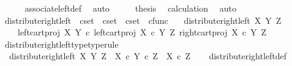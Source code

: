 \begin{isabellebody}
\ \ \ \ \isamarkupfalse%
\ associate{\isacharunderscore}{\kern0pt}left{\isacharunderscore}{\kern0pt}def\ \isamarkupfalse%
\ auto\isanewline
\ \ \isamarkupfalse%
\ \isamarkupfalse%
\ {\isacharquery}{\kern0pt}thesis\ \isamarkupfalse%
\ calculation\ \isamarkupfalse%
\ auto\isanewline
{}\isamarkupfalse%
%
\endisatagproof
{\isafoldproof}%
%
\isadelimproof
%
\endisadelimproof
%
\isadelimdocument
%
\endisadelimdocument
%
\isatagdocument
%
\isamarkuptrue%
%
\endisatagdocument
{\isafolddocument}%
%
\isadelimdocument
%
\endisadelimdocument
{}\isamarkupfalse%
\ distribute{\isacharunderscore}{\kern0pt}right{\isacharunderscore}{\kern0pt}left\ {\isacharcolon}{\kern0pt}{\isacharcolon}{\kern0pt}\ {\isachardoublequoteopen}cset\ {\isasymRightarrow}\ cset\ {\isasymRightarrow}\ cset\ {\isasymRightarrow}\ cfunc{\isachardoublequoteclose}\ \isanewline
\ \ {\isachardoublequoteopen}distribute{\isacharunderscore}{\kern0pt}right{\isacharunderscore}{\kern0pt}left\ X\ Y\ Z\ {\isacharequal}{\kern0pt}\ \isanewline
\ \ \ \ {\isasymlangle}left{\isacharunderscore}{\kern0pt}cart{\isacharunderscore}{\kern0pt}proj\ X\ Y\ {\isasymcirc}\isactrlsub c\ left{\isacharunderscore}{\kern0pt}cart{\isacharunderscore}{\kern0pt}proj\ {\isacharparenleft}{\kern0pt}X\ {\isasymtimes}\isactrlsub c\ Y{\isacharparenright}{\kern0pt}\ Z{\isacharcomma}{\kern0pt}\ right{\isacharunderscore}{\kern0pt}cart{\isacharunderscore}{\kern0pt}proj\ {\isacharparenleft}{\kern0pt}X\ {\isasymtimes}\isactrlsub c\ Y{\isacharparenright}{\kern0pt}\ Z{\isasymrangle}{\isachardoublequoteclose}\isanewline
\isanewline
{}\isamarkupfalse%
\ distribute{\isacharunderscore}{\kern0pt}right{\isacharunderscore}{\kern0pt}left{\isacharunderscore}{\kern0pt}type{\isacharbrackleft}{\kern0pt}type{\isacharunderscore}{\kern0pt}rule{\isacharbrackright}{\kern0pt}{\isacharcolon}{\kern0pt}\isanewline
\ \ {\isachardoublequoteopen}distribute{\isacharunderscore}{\kern0pt}right{\isacharunderscore}{\kern0pt}left\ X\ Y\ Z\ {\isacharcolon}{\kern0pt}\ {\isacharparenleft}{\kern0pt}X\ {\isasymtimes}\isactrlsub c\ Y{\isacharparenright}{\kern0pt}\ {\isasymtimes}\isactrlsub c\ Z\ {\isasymrightarrow}\ X\ {\isasymtimes}\isactrlsub c\ Z{\isachardoublequoteclose}\isanewline
%
\isadelimproof
\ \ %
\endisadelimproof
%
\isatagproof
{}\isamarkupfalse%
\ distribute{\isacharunderscore}{\kern0pt}right{\isacharunderscore}{\kern0pt}left{\isacharunderscore}{\kern0pt}def\isanewline

\end{isabellebody}
